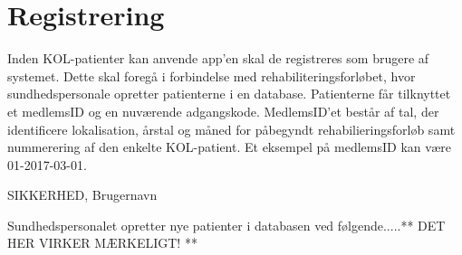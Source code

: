 \section{Registrering}
Inden KOL-patienter kan anvende app'en skal de registreres som brugere af systemet. Dette skal foregå i forbindelse med rehabiliteringsforløbet, hvor sundhedspersonale opretter patienterne i en database. Patienterne får tilknyttet et medlemsID og en nuværende adgangskode. MedlemsID'et består af tal, der identificere lokalisation, årstal og måned for påbegyndt rehabilieringsforløb samt nummerering af den enkelte KOL-patient. Et eksempel på medlemsID kan være 01-2017-03-01. 


SIKKERHED, Brugernavn


Sundhedspersonalet opretter nye patienter i databasen ved følgende.....** DET HER VIRKER MÆRKELIGT! **